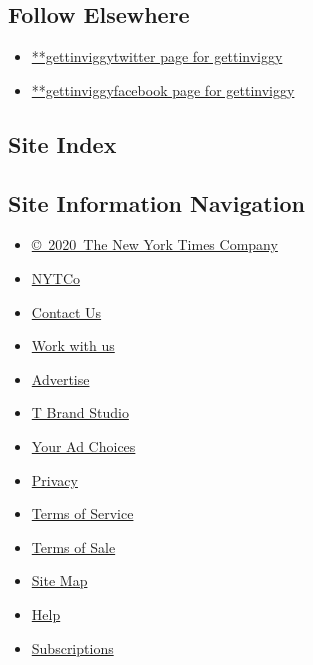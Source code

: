 \hypertarget{follow-elsewhere}{%
\subsection{Follow Elsewhere}\label{follow-elsewhere}}

\begin{itemize}
\tightlist
\item
  \href{https://twitter.com/gettinviggy}{**gettinviggytwitter page for
  gettinviggy}
\item
  \href{https://www.facebook.com/gettinviggy}{**gettinviggyfacebook page
  for gettinviggy}
\end{itemize}

\hypertarget{site-index}{%
\subsection{Site Index}\label{site-index}}

\hypertarget{site-information-navigation}{%
\subsection{Site Information
Navigation}\label{site-information-navigation}}

\begin{itemize}
\tightlist
\item
  \href{https://help.nytimes.com/hc/en-us/articles/115014792127-Copyright-notice}{©~2020~The
  New York Times Company}
\end{itemize}

\begin{itemize}
\tightlist
\item
  \href{https://www.nytco.com/}{NYTCo}
\item
  \href{https://help.nytimes.com/hc/en-us/articles/115015385887-Contact-Us}{Contact
  Us}
\item
  \href{https://www.nytco.com/careers/}{Work with us}
\item
  \href{https://nytmediakit.com/}{Advertise}
\item
  \href{http://www.tbrandstudio.com/}{T Brand Studio}
\item
  \href{https://www.nytimes.com/privacy/cookie-policy\#how-do-i-manage-trackers}{Your
  Ad Choices}
\item
  \href{https://www.nytimes.com/privacy}{Privacy}
\item
  \href{https://help.nytimes.com/hc/en-us/articles/115014893428-Terms-of-service}{Terms
  of Service}
\item
  \href{https://help.nytimes.com/hc/en-us/articles/115014893968-Terms-of-sale}{Terms
  of Sale}
\item
  \href{https://spiderbites.nytimes.com}{Site Map}
\item
  \href{https://help.nytimes.com/hc/en-us}{Help}
\item
  \href{https://www.nytimes.com/subscription?campaignId=37WXW}{Subscriptions}
\end{itemize}
